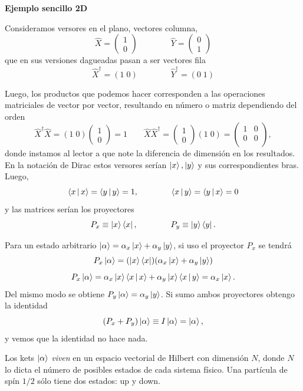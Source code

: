 \documentclass[10pt,oneside]{CBFT_book}
\begin{document}
\begin{ejemplo}{\bf Ejemplo sencillo 2D}
 
Consideramos versores en el plano, vectores columna,
\[
	\hat{X} = \begin{pmatrix} 1 \\ 0 \end{pmatrix} \qquad \qquad \hat{Y} = 
	\begin{pmatrix} 0 \\ 1 \end{pmatrix}
\]
que en sus versiones dagueadas pasan a ser vectores fila
\[
	\hat{X}^\dagger = ( 1 \; 0 ) \qquad \qquad \hat{Y}^\dagger = ( 0 \; 1  ) 
\]

Luego, los productos que podemos hacer corresponden a las operaciones matriciales de
vector por vector, resultando en número o matriz dependiendo del orden
\[
	\hat{X}^\dagger\hat{X} = (1 \; 0) \begin{pmatrix} 1 \\ 0 \end{pmatrix} = 1 \qquad 
	\hat{X}\hat{X}^\dagger = \begin{pmatrix} 1 \\ 0 \end{pmatrix} (1 \; 0) = 
	\begin{pmatrix} 1 & 0 \\ 0 & 0 \\ \end{pmatrix},
\]
donde instamos al lector a que note la diferencia de dimensión en los resultados.
En la notación de Dirac estos versores serían $\Ket{x}, \Ket{y}$ y sus correspondientes
bras. Luego,
\[
	\Braket{x|x} = \Braket{y|y} = 1, \qquad \qquad \Braket{x|y} = \Braket{y|x} = 0
\]
y las matrices serían los proyectores
\[
	P_x \equiv \Ket{x}\Bra{x}, \qquad \qquad  P_y \equiv \Ket{y}\Bra{y}.
\]

Para un estado arbitrario $\Ket{\alpha} = \alpha_x \Ket{x} + \alpha_y \Ket{y}$, si uso el proyector
$P_x$ se tendrá
\[
	P_x \Ket{\alpha} = (\Ket{x}\Bra{x})(\alpha_x \Ket{x} + \alpha_y \Ket{y})
\]
\[
	P_x \Ket{\alpha} = \alpha_x \Ket{x}\Braket{x | x} + \alpha_y \Ket{x}\Braket{x |y} =
	\alpha_x \Ket{x}.
\]
Del mismo modo se obtiene $P_y \Ket{\alpha} = \alpha_y \Ket{y}$. Si sumo ambos proyectores obtengo
la identidad
\[
	(P_x + P_y)\Ket{\alpha} \equiv I \Ket{\alpha} = \Ket{\alpha},
\]
y vemos que la identidad no hace nada.

\end{ejemplo}

Los kets $\Ket{\alpha}$ {\it viven} en un espacio vectorial de Hilbert con dimensión $N$, donde
$N$ lo dicta el número de posibles estados de cada sistema físico. 
Una partícula de spín $1/2$ sólo tiene dos estados: up y down.
\end{document}
